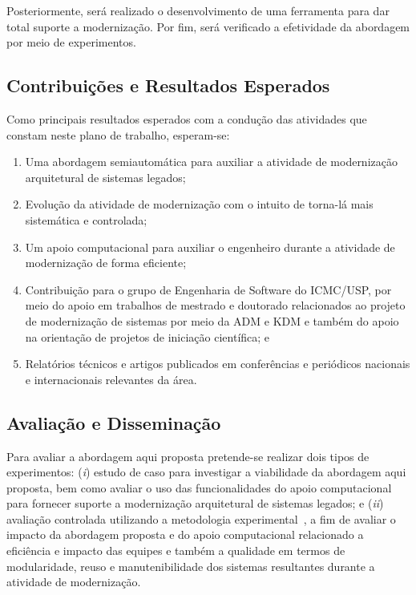 \documentclass[12pt]{article}
\begin{document}
Posteriormente, será realizado o desenvolvimento de uma ferramenta para dar total suporte a modernização. Por fim, será verificado a efetividade da abordagem por meio de experimentos. 

\subsection{Contribuições e Resultados Esperados}\label{sec:resultados_esperados}

Como principais resultados esperados com a condução das atividades que constam neste plano de trabalho, esperam-se:

\begin{enumerate}
\item Uma abordagem semiautomática  para auxiliar a atividade de modernização arquitetural de sistemas legados;
\item Evolução da atividade de modernização com o intuito de torna-lá mais sistemática e controlada;
\item Um apoio computacional para auxiliar o engenheiro durante a atividade de modernização de forma eficiente;
\item Contribuição para o grupo de Engenharia de Software do ICMC/USP, por meio do apoio em trabalhos de mestrado e doutorado relacionados ao projeto de modernização de sistemas por meio da ADM e KDM e também do apoio na orientação de projetos de iniciação científica; e
\item Relatórios técnicos e artigos publicados em conferências e periódicos nacionais e internacionais relevantes da área.
\end{enumerate}

\subsection{Avaliação e Disseminação}

Para avaliar a abordagem aqui proposta pretende-se realizar dois tipos de experimentos: (\textit{i}) estudo de caso para investigar a viabilidade da abordagem aqui proposta, bem como avaliar o uso das funcionalidades do apoio computacional para fornecer suporte a modernização arquitetural de sistemas legados; e (\textit{ii}) avaliação controlada utilizando a metodologia experimental~\cite{Wohlin}, a fim de avaliar o impacto da abordagem proposta e do apoio computacional relacionado a eficiência e impacto das equipes e também a qualidade em termos de modularidade, reuso e manutenibilidade dos sistemas resultantes durante a atividade de modernização.
\end{document}
